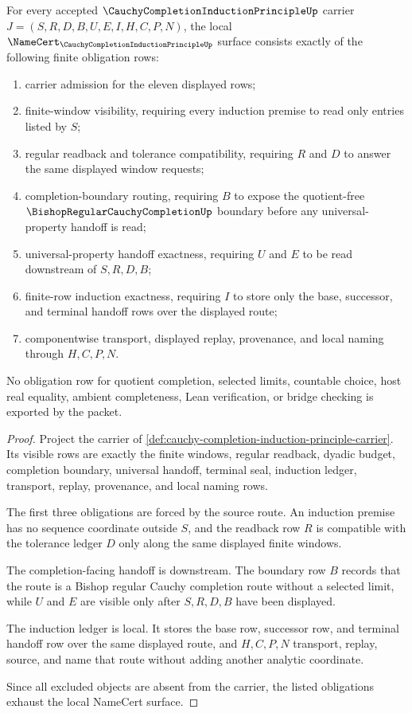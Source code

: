 \begin{theorem}
\label{thm:cauchy-completion-induction-principle-namecert-obligations}
For every accepted $\CauchyCompletionInductionPrincipleUp$ carrier $J=(S,R,D,B,U,E,I,H,C,P,N)$, the local $\NameCert_{\CauchyCompletionInductionPrincipleUp}$ surface consists exactly of the following finite obligation rows:
\begin{enumerate}
\item carrier admission for the eleven displayed rows;
\item finite-window visibility, requiring every induction premise to read only entries listed by $S$;
\item regular readback and tolerance compatibility, requiring $R$ and $D$ to answer the same displayed window requests;
\item completion-boundary routing, requiring $B$ to expose the quotient-free $\BishopRegularCauchyCompletionUp$ boundary before any universal-property handoff is read;
\item universal-property handoff exactness, requiring $U$ and $E$ to be read downstream of $S,R,D,B$;
\item finite-row induction exactness, requiring $I$ to store only the base, successor, and terminal handoff rows over the displayed route;
\item componentwise transport, displayed replay, provenance, and local naming through $H,C,P,N$.
\end{enumerate}
No obligation row for quotient completion, selected limits, countable choice, host real equality, ambient completeness, Lean verification, or bridge checking is exported by the packet.
\end{theorem}
\begin{proof}
Project the carrier of \autoref{def:cauchy-completion-induction-principle-carrier}. Its visible rows are exactly the finite windows, regular readback, dyadic budget, completion boundary, universal handoff, terminal seal, induction ledger, transport, replay, provenance, and local naming rows.

The first three obligations are forced by the source route. An induction premise has no sequence coordinate outside $S$, and the readback row $R$ is compatible with the tolerance ledger $D$ only along the same displayed finite windows.

The completion-facing handoff is downstream. The boundary row $B$ records that the route is a Bishop regular Cauchy completion route without a selected limit, while $U$ and $E$ are visible only after $S,R,D,B$ have been displayed.

The induction ledger is local. It stores the base row, successor row, and terminal handoff row over the same displayed route, and $H,C,P,N$ transport, replay, source, and name that route without adding another analytic coordinate.

Since all excluded objects are absent from the carrier, the listed obligations exhaust the local NameCert surface.
\end{proof}

